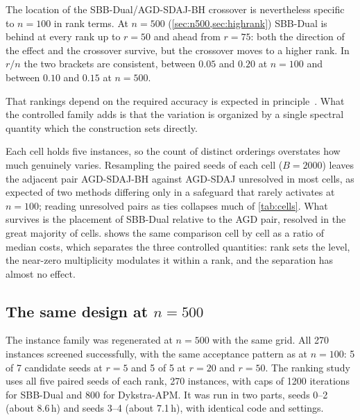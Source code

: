 The location of the SBB-Dual/AGD-SDAJ-BH crossover is nevertheless specific to $n=100$ in rank terms. At
$n=500$ (\cref{sec:n500,sec:highrank}) SBB-Dual is behind at every rank up to
$r=50$ and ahead from $r=75$: both the direction of the effect and the
crossover survive, but the crossover moves to a higher rank. In $r/n$ the two
brackets are consistent, between $0.05$ and $0.20$ at $n=100$ and between
$0.10$ and $0.15$ at $n=500$.

That rankings depend on the required accuracy is expected in
principle~\cite{more2009benchmarking,hansen2021coco}. What the controlled
family adds is that the variation is organized by a single spectral quantity
which the construction sets directly.

Each cell holds five instances, so the count of distinct orderings overstates
how much genuinely varies. Resampling the paired seeds of each cell ($B=2000$)
leaves the adjacent pair AGD-SDAJ-BH against AGD-SDAJ unresolved in most cells,
as expected of two methods differing only in a safeguard that rarely activates
at $n=100$; reading unresolved pairs as ties collapses much of
\cref{tab:cells}. What survives is the placement of SBB-Dual relative to the
AGD pair, resolved in the great majority of cells.
 shows the same comparison cell by cell as a ratio of median
costs, which separates the three controlled quantities: rank sets the level,
the near-zero multiplicity modulates it within a rank, and the separation has
almost no effect.



\subsection{The same design at $n=500$}\label{sec:n500}
The instance family was regenerated at $n=500$ with the same grid. All 270
instances screened successfully, with the same acceptance pattern as at
$n=100$: 5 of 7 candidate seeds at $r=5$ and 5 of 5 at $r=20$ and $r=50$. The
ranking study uses all five paired seeds of
each rank, 270 instances, with caps of 1200 iterations for SBB-Dual and 800
for Dykstra-APM. It was run in two parts, seeds 0--2 (about 8.6\,h) and seeds
3--4 (about 7.1\,h), with identical code and settings.

